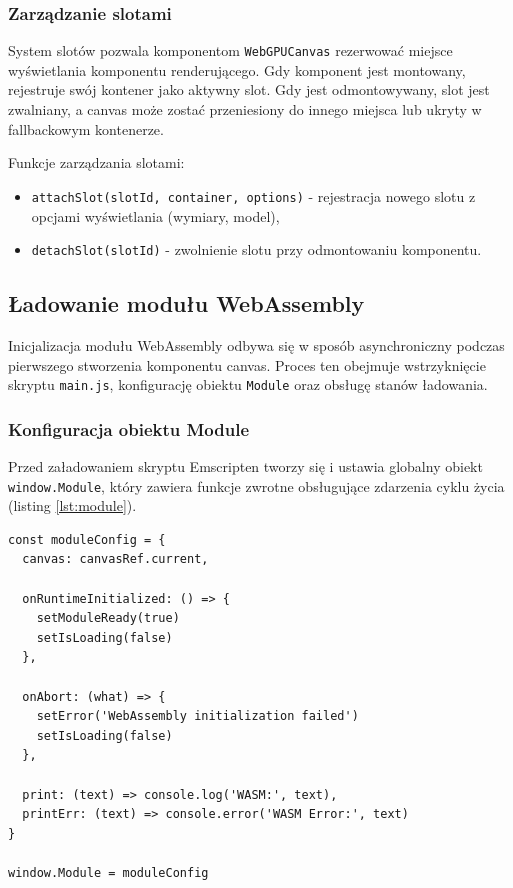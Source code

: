 \subsubsection{Zarządzanie slotami}

System slotów pozwala komponentom \texttt{WebGPUCanvas} rezerwować miejsce wyświetlania komponentu renderującego. Gdy komponent jest montowany, rejestruje swój kontener jako aktywny slot. Gdy jest odmontowywany, slot jest zwalniany, a canvas może zostać przeniesiony do innego miejsca lub ukryty w fallbackowym kontenerze.

Funkcje zarządzania slotami:
\begin{itemize}
  \item \texttt{attachSlot(slotId, container, options)} - rejestracja nowego slotu z opcjami wyświetlania (wymiary, model),
  \item \texttt{detachSlot(slotId)} - zwolnienie slotu przy odmontowaniu komponentu.
\end{itemize}

\subsection{Ładowanie modułu WebAssembly}

Inicjalizacja modułu WebAssembly odbywa się w sposób asynchroniczny podczas pierwszego stworzenia komponentu canvas. Proces ten obejmuje wstrzyknięcie skryptu \texttt{main.js}, konfigurację obiektu \texttt{Module} oraz obsługę stanów ładowania.

\subsubsection{Konfiguracja obiektu Module}

Przed załadowaniem skryptu Emscripten tworzy się i ustawia globalny obiekt \texttt{window.\hspace{0pt}Module}, który zawiera funkcje zwrotne obsługujące zdarzenia cyklu życia (listing \ref{lst:module}).

\begin{lstlisting}[style=javascript, caption={Konfiguracja obiektu Module}, label={lst:module}]
const moduleConfig = {
  canvas: canvasRef.current,
  
  onRuntimeInitialized: () => {
    setModuleReady(true)
    setIsLoading(false)
  },
  
  onAbort: (what) => {
    setError('WebAssembly initialization failed')
    setIsLoading(false)
  },
  
  print: (text) => console.log('WASM:', text),
  printErr: (text) => console.error('WASM Error:', text)
}

window.Module = moduleConfig
\end{lstlisting}

